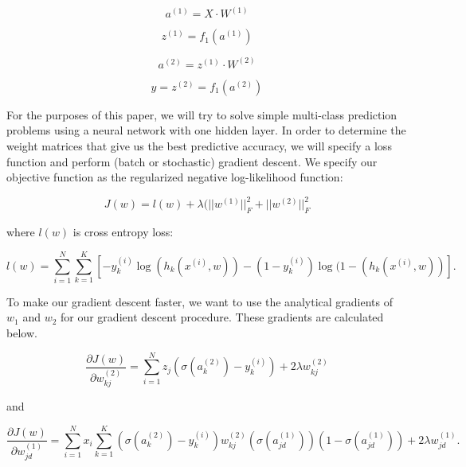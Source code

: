 \documentclass[10pt]{article}
\begin{document}
\begin{equation}
a^{(1)} = X\cdot W^{(1)}	
\end{equation}

\begin{equation}
z^{(1)} = f_1(a^{(1)})
\end{equation}

\begin{equation}
a^{(2)} = z^{(1)}\cdot W^{(2)}	
\end{equation}

\begin{equation}
y = z^{(2)} = f_1(a^{(2)})
\end{equation}

For the purposes of this paper, we will try to solve simple multi-class prediction problems using a neural network with one hidden layer. In order to determine the weight matrices that give us the best predictive accuracy, we will specify a loss function and perform (batch or stochastic) gradient descent. We specify our objective function as the regularized negative log-likelihood function:

\begin{equation}
J(w) = l(w) +\lambda(||w^{(1)}||^2_F + ||w^{(2)}||^2_F
\end{equation}

\noindent where $l(w)$ is cross entropy loss:

\begin{equation}
l(w) = \sum_{i=1}^N \sum_{k=1}^{K} [-y_k^{(i)}\log(h_k(x^{(i)},w)) - (1-y_k^{(i)})\log(1-(h_k(x^{(i)},w))].
\end{equation}

To make our gradient descent faster, we want to use the analytical gradients of $w_1$ and $w_2$ for our gradient descent procedure. These gradients are calculated below.

\begin{equation}
\frac{\partial J(w)}{\partial w_{kj}^{(2)}} = \sum_{i=1}^N z_j \left(\sigma(a_k^{(2)}) -y_k^{(i)} \right) + 2 \lambda w_{kj}^{(2)}
\end{equation}

\noindent and 

\begin{equation}
\frac{\partial J(w)}{\partial w_{jd}^{(1)}} =  \sum_{i=1}^N x_i \sum_{k=1}^{K} \left(\sigma(a_k^{(2)}) -y_k^{(i)}\right) w_{kj}^{(2)} \left(\sigma(a_{jd}^{(1)})\right)\left(1-\sigma(a_{jd}^{(1)})\right) + 2 \lambda w_{jd}^{(1)}.
\end{equation}
\end{document}
